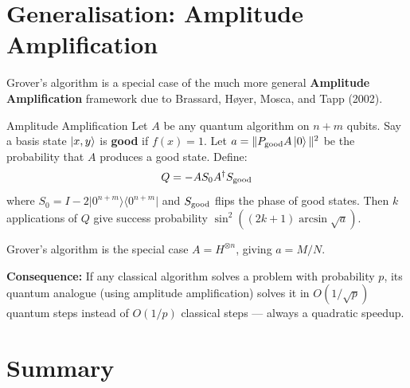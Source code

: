 \documentclass[12pt,a4paper]{article}
\newcommand{\proj}[1]{\vert#1\rangle\langle#1\vert}
\begin{document}
\section{Generalisation: Amplitude Amplification}
\label{sec:ampamp}

Grover's algorithm is a special case of the much more general \textbf{Amplitude Amplification} framework due to Brassard, Høyer, Mosca, and Tapp (2002).

\begin{defbox}{Amplitude Amplification}
Let $A$ be any quantum algorithm on $n+m$ qubits. Say a basis state $\ket{x,y}$ is \textbf{good} if $f(x)=1$. Let $a = \|P_{\rm good}A\ket{0}\|^2$ be the probability that $A$ produces a good state. Define:
\[
  Q = -A S_0 A^\dagger S_{\rm good}
\]
where $S_0 = I - 2\proj{0^{n+m}}$ and $S_{\rm good}$ flips the phase of good states. Then $k$ applications of $Q$ give success probability $\sin^2((2k+1)\arcsin\sqrt{a})$.
\end{defbox}

Grover's algorithm is the special case $A = H^{\otimes n}$, giving $a=M/N$.

\textbf{Consequence:} If any classical algorithm solves a problem with probability $p$, its quantum analogue (using amplitude amplification) solves it in $O(1/\sqrt{p})$ quantum steps instead of $O(1/p)$ classical steps — always a quadratic speedup.

\section{Summary}
\label{sec:summary}
\end{document}
